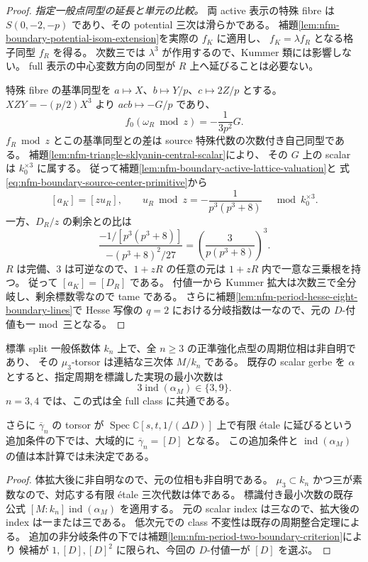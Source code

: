 \begin{proof}
\emph{指定一般点同型の延長と単元の比較。}
両 active 表示の特殊 fibre は $S(0,-2,-p)$ であり、その potential 三次は滑らかである。
補題\ref{lem:nfm-boundary-potential-isom-extension}を実際の $f_K$ に適用し、
$f_K=\lambda f_R$ となる格子同型 $f_R$ を得る。
次数三では $\lambda^3$ が作用するので、Kummer 類には影響しない。
full 表示の中心変数方向の同型が $R$ 上へ延びることは必要ない。

特殊 fibre の基準同型を
$a\mapsto X$、$b\mapsto Y/p$、$c\mapsto2Z/p$ とする。
$XZY=-(p/2)X^3$ より $acb\mapsto-G/p$ であり、
\[
 f_0(\omega_R\bmod z)=-\frac1{3p^2}G.
\]
$f_R\bmod z$ とこの基準同型との差は source 特殊代数の次数付き自己同型である。
補題\ref{lem:nfm-triangle-sklyanin-central-scalar}により、
その $G$ 上の scalar は $k_0^{\times3}$ に属する。
従って補題\ref{lem:nfm-boundary-active-lattice-valuation}と
式\eqref{eq:nfm-boundary-source-center-primitive}から
\[
 [a_K]=[zu_R],\qquad
 u_R\bmod z=-\frac1{p^3(p^3+8)}
                  \quad\bmod k_0^{\times3}.
\]
一方、$D_R/z$ の剰余との比は
\[
 \frac{-1/[p^3(p^3+8)]}{-(p^3+8)^2/27}
       =\left(\frac3{p(p^3+8)}\right)^3.
\]
$R$ は完備、$3$ は可逆なので、$1+zR$ の任意の元は $1+zR$ 内で一意な三乗根を持つ。
従って $[a_K]=[D_R]$ である。
付値一から Kummer 拡大は次数三で全分岐し、剰余標数零なので tame である。
さらに補題\ref{lem:nfm-period-hesse-eight-boundary-lines}で
Hesse 写像の $q=2$ における分岐指数は一なので、元の $D$-付値も一 mod~三となる。
\end{proof}

\begin{corollary}[正準位相体の次数と大域式への残る条件]
\label{cor:nfm-boundary-phase-degree-three}
標準 split 一般係数体 $k_n$ 上で、全 $n\ge3$ の正準強化点型の周期位相は非自明であり、
その $\mu_3$-torsor は連結な三次体 $M/k_n$ である。
既存の scalar gerbe を $\alpha$ とすると、指定周期を標識した実現の最小次数は
\[
 3\operatorname{ind}(\alpha_M)\in\{3,9\}.
\]
$n=3,4$ では、この式は全 full class に共通である。

さらに $\overline\gamma_n$ の torsor が
$\operatorname{Spec}\mathbb C[s,t,1/(\Delta D)]$ 上で有限 étale に延びるという
追加条件の下では、大域的に $\overline\gamma_n=[D]$ となる。
この追加条件と $\operatorname{ind}(\alpha_M)$ の値は本計算では未決定である。
\end{corollary}
\begin{proof}
体拡大後に非自明なので、元の位相も非自明である。
$\mu_3\subset k_n$ かつ三が素数なので、対応する有限 étale 三次代数は体である。
標識付き最小次数の既存公式 $[M:k_n]\operatorname{ind}(\alpha_M)$ を適用する。
元の scalar index は三なので、拡大後の index は一または三である。
低次元での class 不変性は既存の周期整合定理による。
追加の非分岐条件の下では補題\ref{lem:nfm-period-two-boundary-criterion}により
候補が $1,[D],[D]^2$ に限られ、今回の $D$-付値一が $[D]$ を選ぶ。
\end{proof}

